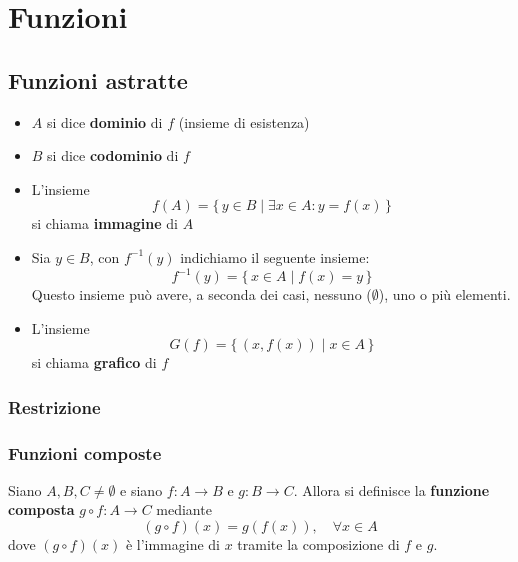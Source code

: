 \chapter{Funzioni}

\section{Funzioni astratte}


\begin{itemize}
    \item $A$ si dice \textbf{dominio} di $f$ (insieme di esistenza)
    \item $B$ si dice \textbf{codominio} di $f$
    \item L'insieme
    \[
    f(A) = \{\, y \in B \mid \exists x \in A : y = f(x) \,\}
    \]
    si chiama \textbf{immagine} di $A$
    \item Sia $y \in B$, con $f^{-1}(y)$ indichiamo il seguente insieme:
    \[
    f^{-1}(y) = \{\, x \in A \mid f(x) = y \,\}
    \]
    Questo insieme può avere, a seconda dei casi, nessuno ($\emptyset$), uno o più elementi.
    \item L'insieme
    \[
    G(f) = \{\, (x, f(x)) \mid x \in A \,\}
    \]
    si chiama \textbf{grafico} di $f$
\end{itemize}

\subsection{Restrizione}


\subsection{Funzioni composte}
Siano $A, B, C \ne \emptyset$ e siano $f: A \to B$ e $g: B \to C$.
Allora si definisce la \textbf{funzione composta} $g \circ f: A \to C$ mediante
\[
(g \circ f)(x) = g(f(x)), \quad \forall x \in A
\]
dove $(g \circ f)(x)$ è l'immagine di $x$ tramite la composizione di $f$ e $g$.

